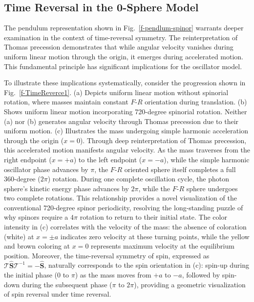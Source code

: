 \documentclass[%
 reprint,
 amsmath,amssymb,
 aps,
]{revtex4-1}
\numberwithin{equation}{section}%
\begin{document}
\subsection{Time Reversal in the 0-Sphere Model}

The pendulum representation shown in Fig.~\ref{f-pendlum-spinor} warrants deeper examination in the context of time-reversal symmetry. The reinterpretation of Thomas precession demonstrates that while angular velocity vanishes during uniform linear motion through the origin, it emerges during accelerated motion. This fundamental principle has significant implications for the oscillator model.

To illustrate these implications systematically, consider the progression shown in Fig.~\ref{f-TimeReverce1}. (a) Depicts uniform linear motion without spinorial rotation, where masses maintain constant $F$-$R$ orientation during translation. (b) Shows uniform linear motion incorporating 720-degree spinorial rotation. Neither (a) nor (b) generates angular velocity through Thomas precession due to their uniform motion. (c) Illustrates the mass undergoing simple harmonic acceleration through the origin ($x = 0$). Through deep reinterpretation of Thomas precession, this accelerated motion manifests angular velocity. As the mass traverses from the right endpoint ($x = +a$) to the left endpoint ($x = -a$), while the simple harmonic oscillator phase advances by $\pi$, the $F$-$R$ oriented sphere itself completes a full 360-degree ($2\pi$) rotation. During one complete oscillation cycle, the photon sphere's kinetic energy phase advances by $2\pi$, while the $F$-$R$ sphere undergoes two complete rotations. This relationship provides a novel visualization of the conventional 720-degree spinor periodicity, resolving the long-standing puzzle of why spinors require a $4\pi$ rotation to return to their initial state. The color intensity in (c) correlates with the velocity of the mass: the absence of coloration (white) at $x = \pm a$ indicates zero velocity at these turning points, while the yellow and brown coloring at $x = 0$ represents maximum velocity at the equilibrium position. Moreover, the time-reversal symmetry of spin, expressed as $\mathcal{T}\hat{\boldsymbol{S}}\mathcal{T}^{-1} = -\hat{\boldsymbol{S}}$, naturally corresponds to the spin orientation in (c): spin-up during the initial phase ($0$ to $\pi$) as the mass moves from $+a$ to $-a$, followed by spin-down during the subsequent phase ($\pi$ to $2\pi$), providing a geometric visualization of spin reversal under time reversal.
\end{document}
